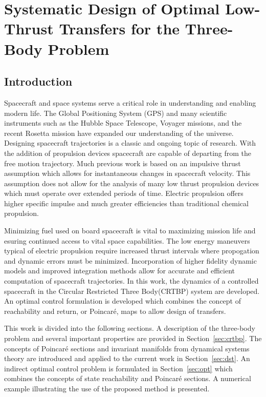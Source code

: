 \chapter{Systematic Design of Optimal Low-Thrust Transfers for the Three-Body Problem}
\section{Introduction}
Spacecraft and space systems serve a critical role in understanding and enabling modern life.
The Global Positioning System (GPS) and many scientific instruments such as the Hubble Space Telescope, Voyager missions, and the recent Rosetta mission have expanded our understanding of the universe.
Designing spacecraft trajectories is a classic and ongoing topic of research.
With the addition of propulsion devices spacecraft are capable of departing from the free motion trajectory.
Much previous work is based on an impulsive thrust assumption which allows for instantaneous changes in spacecraft velocity.
This assumption does not allow for the analysis of many low thrust propulsion devices which must operate over extended periods of time.
Electric propulsion offers higher specific impulse and much greater efficiencies than traditional chemical propulsion.

Minimizing fuel used on board spacecraft is vital to maximizing mission life and esuring continued access to vital space capabilities.
The low energy maneuvers typical of electric propulsion require increased thrust intervals where propogation and dynamic errors must be minimized.
Incorporation of higher fidelity dynamic models and improved integration methods allow for accurate and efficient computation of spacecraft trajectories.
In this work, the dynamics of a controlled spacecraft in the Circular Restricted Three Body(CRTBP) system are developed.
An optimal control formulation is developed which combines the concept of reachability and return, or Poincar\'e, maps to allow design of transfers.

This work is divided into the following sections.
A description of the three-body problem and several important properties are provided in Section~\ref{sec:crtbp}.
The concepts of Poincar\'e sections and invariant manifolds from dynamical systems theory are introduced and applied to the current work in Section~\ref{sec:dst}.
An indirect optimal control problem is formulated in Section~\ref{sec:opt} which combines the concepts of state reachability and Poincar\'e sections.
A numerical example illustrating the use of the proposed method is presented.

